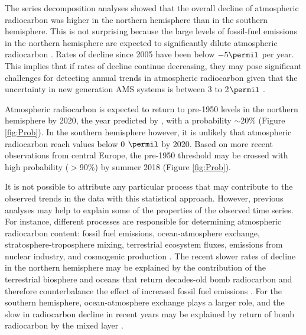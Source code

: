 The series decomposition analyses showed that the overall decline of atmospheric radiocarbon was higher in the northern hemisphere than in the southern hemisphere. This is not surprising because the large levels of fossil-fuel emissions in the northern hemisphere are expected to significantly dilute atmospheric radiocarbon \citep{Levin1989Radiocarbon, Levin2010Tellus, Turnbull2009JGR, Graven2012JGR}. Rates of decline since 2005 have been below $ -5 \permil$ per year. This implies that if rates of decline continue decreasing, they may pose significant challenges for detecting annual trends in atmospheric radiocarbon given that the uncertainty in new generation AMS systems is between 3 to 2$\permil$ \citep{Synal2007, Wacker2010}.

Atmospheric radiocarbon is expected to return to pre-1950 levels in the northern hemisphere by 2020, the year predicted by  \citet{Caldeira1998GRL}, with a probability $\sim$20\% (Figure \ref{fig:Prob}). In the southern hemisphere however, it is unlikely that atmospheric radiocarbon reach values below 0 $\permil$ by 2020. Based on more recent observations from central Europe, the pre-1950 threshold may be crossed with high probability ($>$90\%) by summer 2018 (Figure \ref{fig:Prob}). 

It is not possible to attribute any particular process that may contribute to the observed trends in the data with this statistical approach. However, previous analyses \citep{Caldeira1998GRL, Randerson2002GBC, Levin2013Tellus, Currie2011} may help to explain some of the properties of the observed time series. For instance, different processes are responsible for determining atmospheric radiocarbon content: fossil fuel emissions, ocean-atmosphere exchange, stratosphere-troposphere mixing, terrestrial ecosystem fluxes, emissions from nuclear industry, and cosmogenic production \citep{Oeschger1975Tellus, Randerson2002GBC, Naegler2006, Levin2010Tellus, Graven2015PNAS}. The recent slower rates of decline in the northern hemisphere may be explained by the contribution of the terrestrial biosphere and oceans that return decades-old bomb radiocarbon and therefore counterbalance the effect of increased fossil fuel emissions \citep{Caldeira1998GRL, Randerson2002GBC, Currie2011}. For the southern hemisphere, ocean-atmosphere exchange plays a larger role, and the slow in radiocarbon decline in recent years may be explained by return of bomb radiocarbon by the mixed layer \citep{Currie2011}.


